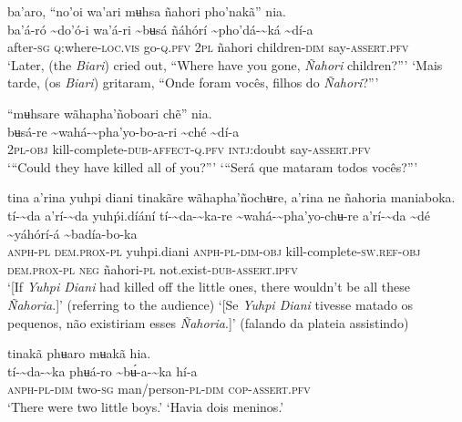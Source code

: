 \documentclass[output=paper,
modfonts,nonflat
]{langsci/langscibook}
\begin{document}
\largerpage
\ea ba'aro, “no'oi wa'ari mʉhsa ñahori pho'nakã” nia. \\[.3em]
\gll ba'á-ró{\footnotemark}	{\textasciitilde}do'ó-i	wa'á-ri	{\textasciitilde}bʉsá	ñáhórí	{\textasciitilde}pho'dá-{\textasciitilde}ká	{\textasciitilde}dí-a\\
     after\textsc{-sg}	\textsc{q:}where-\textsc{loc.vis}	go-\textsc{q.pfv}	2\textsc{pl}	ñahori	children-\textsc{dim}	say-\textsc{assert.pfv}\\
\glt ‘Later, (the \textit{Biari}) cried out, “Where have you gone, \textit{Ñahori} children?”’
\glt ‘Mais tarde, (os \textit{Biari}) gritaram, “Onde foram vocês, filhos do \textit{Ñahori}?”’
\z 

\ea “mʉhsare wãhapha'ñoboari chẽ” nia.\\[.3em]
\gll {\textasciitilde}bʉsá-re	{\textasciitilde}wahá-{\textasciitilde}pha'yo-bo-a-ri	{\textasciitilde}ché	{\textasciitilde}dí-a\\
     2\textsc{pl-obj}	kill-complete\textsc{-dub-affect-q.pfv}	\textsc{intj}:doubt	say-\textsc{assert.pfv}\\
\glt ‘“Could they have killed all of you?”’
\glt ‘“Será que mataram todos vocês?”’
\z 

\ea tina a’rina yuhpi diani tinakãre wãhapha'ñochʉre, a’rina ne ñahoria maniaboka. \\[.3em]
\gll tí-{\textasciitilde}da	a’rí-{\textasciitilde}da	yuhṕi.díání	tí-{\textasciitilde}da-{\textasciitilde}ka-re	{\textasciitilde}wahá-{\textasciitilde}pha'yo-chʉ-re a’rí-{\textasciitilde}da	{\textasciitilde}dé	{\textasciitilde}yáhórí-á	{\textasciitilde}badía-bo-ka\\
     \textsc{anph-pl}	\textsc{dem.prox-pl}	yuhpi.diani	\textsc{anph-pl-dim-obj}	kill-complete-\textsc{sw.ref-obj} \textsc{dem.prox-pl}	\textsc{neg}	ñahori-\textsc{pl}	not.exist-\textsc{dub-assert.ipfv}\\
\glt ‘[If \textit{Yuhpi Diani} had killed off the little ones, there wouldn't be all these \textit{Ñahoria}.]’ (referring to the audience)
\glt ‘[Se \textit{Yuhpi Diani} tivesse matado os pequenos, não existiriam esses \textit{Ñahoria}.]’ (falando da plateia assistindo)
\z 

 
\ea tinakã phʉaro mʉakã hia.  \\[.3em]
\gll tí-{\textasciitilde}da-{\textasciitilde}ka	phʉá-ro	{\textasciitilde}bʉ́-a-{\textasciitilde}ka	hí-a \\
     \textsc{anph-pl-dim}	two\textsc{-sg}	man/person-\textsc{pl-dim}	\textsc{cop-assert.pfv}\\
\glt ‘There were two little boys.’
\glt ‘Havia dois meninos.’
\z
\end{document}
